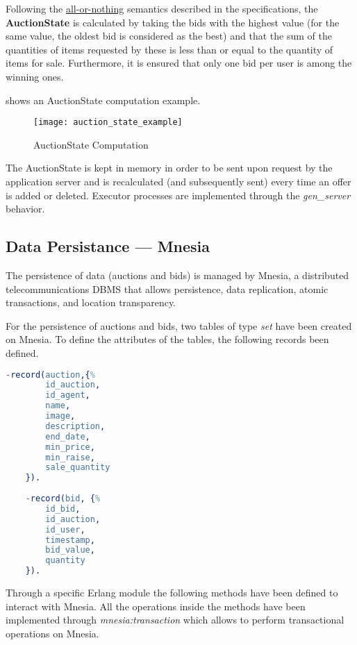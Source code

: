 Following the \underline{all-or-nothing} semantics described in the
specifications, the \textbf{AuctionState} is calculated by taking the bids with
the highest value (for the same value, the oldest bid is considered as the best)
and that the sum of the quantities of items requested by these is less than or
equal to the quantity of items for sale. Furthermore, it is ensured that only
one bid per user is among the winning ones.

 shows an AuctionState computation example.


\begin{figure}[h]
	\centering
	\texttt{[image: auction\_state\_example]}
	\caption{AuctionState Computation}\label{fig:auction_state_example}
\end{figure}

The AuctionState is kept in memory in order to be sent upon request by the
application server and is recalculated (and subsequently sent) every time an
offer is added or deleted. Executor processes are implemented through the
\textit{gen\_server} behavior.



\subsection{Data Persistance --- Mnesia}

The persistence of data (auctions and bids) is managed by Mnesia, a distributed
telecommunications DBMS that allows persistence, data replication, atomic
transactions, and location transparency.

For the persistence of auctions and bids, two tables of type \textit{set} have
been created on Mnesia. To define the attributes of the tables, the following
records been defined.


\begin{lstlisting}[language=Erlang, caption=Mnesia Record]
    -record(auction,{%
        id_auction, 
        id_agent, 
        name, 
        image, 
        description, 
        end_date, 
        min_price, 
        min_raise, 
        sale_quantity
    }).
    
    -record(bid, {%
        id_bid, 
        id_auction, 
        id_user, 
        timestamp,
        bid_value, 
        quantity
    }).
\end{lstlisting}


Through a specific Erlang module the following methods have been defined to
interact with Mnesia. All the operations inside the methods have been
implemented through \textit{mnesia:transaction} which allows to perform
transactional operations on Mnesia.


